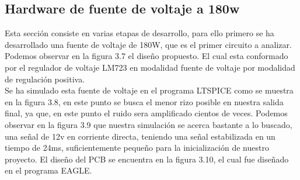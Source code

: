 \subsection{Hardware de fuente de voltaje a 180w}

Esta sección consiste en varias etapas de desarrollo, para ello primero se ha desarrollado una fuente de voltaje de 180W, que es el primer circuito a analizar. Podemos observar en la figura 3.7 el diseño propuesto. El cual esta conformado por el regulador de voltaje LM723 en modalidad fuente de voltaje por modalidad de regulación positiva.\\

Se ha simulado esta fuente de voltaje en el programa LTSPICE como se muestra en la figura 3.8, en este punto se busca el menor rizo posible en nuestra salida final, ya que, en este punto el ruido sera amplificado cientos de veces. Podemos observar en la figura 3.9 que nuestra simulación se acerca bastante a lo buscado, una señal de 12v en corriente directa, teniendo una señal estabilizada en un tiempo de 24ms, suficientemente pequeño para la inicialización de nuestro proyecto. El diseño del PCB se encuentra en la figura 3.10, el cual fue diseñado en el programa EAGLE.\\

